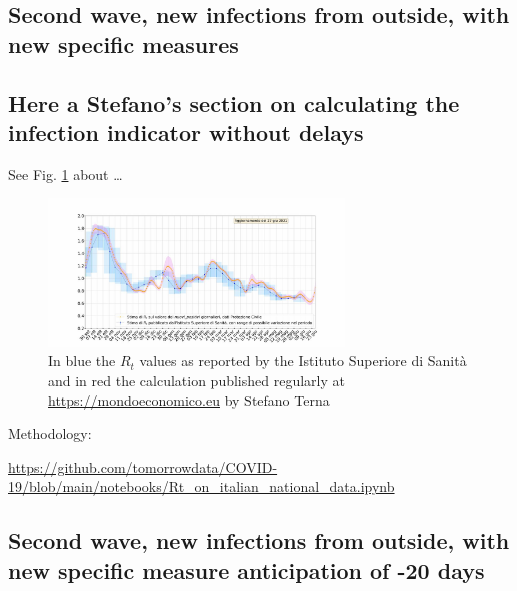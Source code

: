 \documentclass[graybox]{svmult}
\begin{document}
\subsection{Second wave, new infections from outside, with new specific measures}
\label{secondWith}



\subsection{Here a Stefano's section on calculating the infection indicator without delays}
\label{indicator}

See Fig. \ref{Rt} about \ldots

\begin{figure}[t]
\center
\includegraphics[width=0.7\textwidth]{RtEstimation.jpg}
\caption{In blue the $R_t$ values as reported by the Istituto Superiore di Sanit\`{a} and in red the calculation published regularly at \href{https://mondoeconomico.eu}{https://mondoeconomico.eu} by Stefano Terna}
\label{Rt}
\end{figure}

Methodology: 

\href{https://github.com/tomorrowdata/COVID-19/blob/main/notebooks/Rt\_on\_italian_national\_data.ipynb}{https://github.com/tomorrowdata/COVID-19/blob/main/notebooks/Rt\_on\_italian\_national\_data.ipynb}


\subsection{Second wave, new infections from outside, with new specific measure anticipation of -20 days}
\label{anticip}
\end{document}
